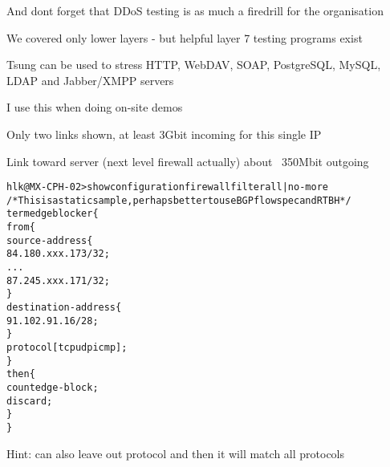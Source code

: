 \documentclass[Screen16to9,17pt]{foils}
\begin{document}
\vskip 2cm
\centerline{And dont forget that DDoS testing is as much a firedrill for the organisation}



\begin{list1}
\item We covered only lower layers - but helpful layer 7 testing programs exist
\item Tsung can be used to stress HTTP, WebDAV, SOAP, PostgreSQL, MySQL, LDAP and Jabber/XMPP servers 
\end{list1}

\myquestionspage




I use this when doing on-site demos




\centerline{Only two links shown, at least 3Gbit incoming for this single IP}

\centerline{Link toward server (next level firewall actually) about ~350Mbit outgoing}



\begin{alltt}\footnotesize
hlk@MX-CPH-02> show configuration firewall filter all | no-more
/* This is a static sample, perhaps better to use BGP flowspec and RTBH */
term edgeblocker \{
    from \{
        source-address \{
            84.180.xxx.173/32;
...
            87.245.xxx.171/32;
        \}
        destination-address \{
            91.102.91.16/28;
        \}
        protocol [ tcp udp icmp ];
    \}
    then \{
        count edge-block;
        discard;
    \}
\}
\end{alltt}
Hint: can also leave out protocol and then it will match all protocols

\end{document}
